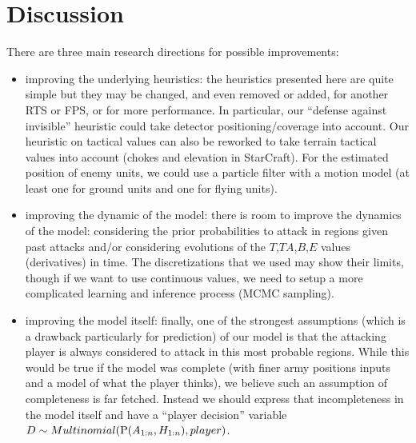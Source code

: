 \section{Discussion}
There are three main research directions for possible improvements:
\begin{itemize}
    \item improving the underlying heuristics: the heuristics presented here are quite simple but they may be changed, and even removed or added, for another RTS or FPS, or for more performance. In particular, our ``defense against invisible'' heuristic could take detector positioning/coverage into account. Our heuristic on tactical values can also be reworked to take terrain tactical values into account (chokes and elevation in StarCraft). For the estimated position of enemy units, we could use a particle filter \cite{weber2011aiide} with a motion model (at least one for ground units and one for flying units). 
    \item improving the dynamic of the model: there is room to improve the dynamics of the model: considering the prior probabilities to attack in regions given past attacks and/or considering evolutions of the $T$,$TA$,$B$,$E$ values (derivatives) in time. The discretizations that we used may show their limits, though if we want to use continuous values, we need to setup a more complicated learning and inference process (MCMC sampling).
    \item improving the model itself: finally, one of the strongest assumptions (which is a drawback particularly for prediction) of our model is that the attacking player is always considered to attack in this most probable regions. While this would be true if the model was complete (with finer army positions inputs and a model of what the player thinks), we believe such an assumption of completeness is far fetched. Instead we should express that incompleteness in the model itself and have a ``player decision'' variable $D \sim Multinomial(\mathrm{P}(A_{1:n},H_{1:n}),player)$.
\end{itemize} 


